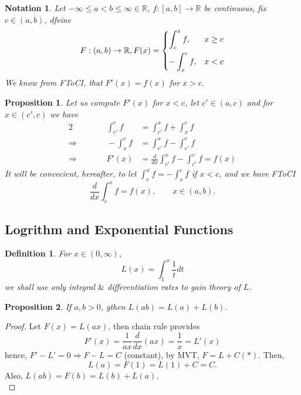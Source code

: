 \documentclass[12pt]{article}
\theoremstyle{plain}
\newtheorem{definition}{Definition}[subsection]
\newtheorem{proposition}{Proposition}[subsection]
\newtheorem{notation}{Notation}[subsection]
\newcommand{\mR}{{\mathbb{R}}}
\begin{document}
	\begin{notation}
		Let $-\infty \leq a < b \leq \infty \in \mR$, $f:[a,b] \to \mR$ be 
		continuous, fix $c \in (a,b)$, dfeine 
		\[
			F:(a,b) \to \mR, F(x) = 
			\begin{dcases}
				\int_c^x f, & x \geq c\\
				-\int_x^c f, & x < c
			\end{dcases}
		\]
		We know from FToCI, that $F'(x) = f(x)$ for $x > c$. \\
	\end{notation}

	\begin{proposition}
		Let us compute $F'(x)$ for $x < c$, let $c'\in (a,c)$ and for $x \in 
		(c',c)$ we have 
		\begin{alignat*}{2}
			& &\qquad \int_{c'}^c f &= \int_{c'}^x f + \int_x^c f \\
			\Rightarrow& &\qquad 
			-\int_x^c f &= \int_{c'}^x f - \int_{c'}^c f \\
			\Rightarrow& &\qquad 
			F'(x) &= \frac{d}{dx} \int_{c'}^x f - \int_{c'}^c f =f(x)
		\end{alignat*}
		It will be convecient, hereafter, to let $\int_c^x f = - \int_x^c f$
		if $x <c$, and we have FToCI
		\[
			\frac d{dx} \int_c^x f = f(x), \qquad x \in (a,b).
		\]
	\end{proposition}
	


	\newpage
	\subsection{Logrithm and Exponential Functions}

	\begin{definition}
		For $x \in (0,\infty)$, 
		\[
			L(x) = \int_1^x \frac 1t dt
		\]
		we shall use only integral $\&$ differentiation rates to gain theory of
		$L$. \\
	\end{definition}
		
	\begin{proposition}
		If $a,b > 0$, gthen $L(ab) = L(a)+L(b)$.
	\end{proposition}
	\begin{proof}
		Let $F(x) = L(ax)$, then chain rule provides 
		\[
			F'(x) = \frac1{ax} \frac d{dx}(ax) = \frac 1x =L'(x)
		\]
		hence, $F' - L' = 0 \Rightarrow F-L=C$ (constant), by MVT, 
		$F = L+C (*)$.
		Then, 
		\[
			L(a) = F(1) = L(1) + C = C. 
		\]
		Also, $L(ab) = F(b) = L(b) + L(a)$. \\
	\end{proof}
\end{document}
